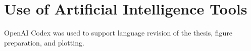 \chapter*{Use of Artificial Intelligence Tools}

OpenAI Codex was used to support language revision of the thesis, figure preparation, and plotting. 
